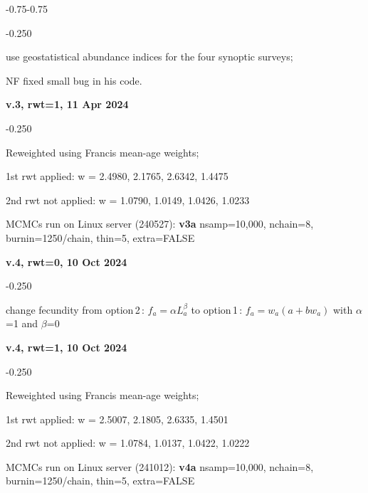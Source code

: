 \begin{itemize_csas}{-0.75}{-0.75}
	\begin{itemize_csas}{-0.25}{0}
		\item use geostatistical abundance indices for the four synoptic surveys;
		\item NF fixed small bug in his code.
	\end{itemize_csas}
	\item \textbf{v.3, rwt=1, 11 Apr 2024}
	\begin{itemize_csas}{-0.25}{0}
		\item Reweighted using Francis mean-age weights;
		\item 1st rwt applied: w = 2.4980, 2.1765, 2.6342, 1.4475
		\item 2nd rwt not applied: w = 1.0790, 1.0149, 1.0426, 1.0233 
		\item MCMCs run on Linux server (240527): \textbf{v3a} nsamp=10,000, nchain=8, burnin=1250/chain, thin=5, extra=FALSE
	\end{itemize_csas}
	\item \textbf{v.4, rwt=0, 10 Oct 2024}
	\begin{itemize_csas}{-0.25}{0}
		\item change fecundity from option\,2\,: $f_a = \alpha L_a^{\beta}$ to option\,1\,:  $f_a = w_a (a + b w_a)$ with $\alpha$=1 and $\beta$=0
	\end{itemize_csas}
	\item \textbf{v.4, rwt=1, 10 Oct 2024}
	\begin{itemize_csas}{-0.25}{0}
		\item Reweighted using Francis mean-age weights;
		\item 1st rwt applied: w = 2.5007, 2.1805, 2.6335, 1.4501
		\item 2nd rwt not applied: w = 1.0784, 1.0137, 1.0422, 1.0222
		\item MCMCs run on Linux server (241012): \textbf{v4a} nsamp=10,000, nchain=8, burnin=1250/chain, thin=5, extra=FALSE
	\end{itemize_csas}
\end{itemize_csas}

